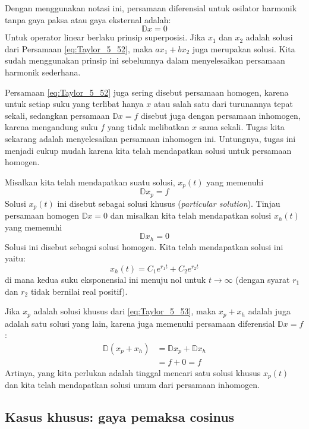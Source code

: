 Dengan menggunakan notasi ini, persamaan diferensial untuk osilator
harmonik tanpa gaya paksa atau gaya eksternal adalah:
\begin{equation}
\mathbb{D}x = 0
\label{eq:Taylor_5_52}
\end{equation}
Untuk operator linear berlaku prinsip superposisi. Jika $x_1$ dan $x_2$ adalah solusi
dari Persamaan \eqref{eq:Taylor_5_52}, maka $ax_1 + bx_2$ juga merupakan solusi. Kita
sudah menggunakan prinsip ini sebelumnya dalam menyelesaikan persamaan harmonik
sederhana.

Persamaan \eqref{eq:Taylor_5_52} juga sering disebut persamaan homogen, karena untuk
setiap suku yang terlibat hanya $x$ atau salah satu dari turunannya
tepat sekali, sedangkan persamaan $\mathbb{D}x = f$ disebut juga dengan
persamaan inhomogen, karena mengandung suku $f$ yang tidak melibatkan
$x$ sama sekali. Tugas kita sekarang adalah menyelesaikan persamaan inhomogen ini.
Untungnya, tugas ini menjadi cukup mudah karena kita telah mendapatkan
solusi untuk persamaan homogen.

Misalkan kita telah mendapatkan suatu solusi, $x_{p}(t)$ yang memenuhi
\begin{equation}
\mathbb{D}x_{p} = f
\label{eq:Taylor_5_53}
\end{equation}
Solusi $x_{p}(t)$ ini disebut sebagai solusi khusus (\textit{particular solution}).
Tinjau persamaan homogen $\mathbb{D}x=0$ dan misalkan kita telah
mendapatkan solusi $x_{h}(t)$ yang memenuhi
\begin{equation*}
\mathbb{D}x_{h}=0
\end{equation*}
Solusi ini disebut sebagai solusi homogen. Kita telah mendapatkan solusi ini
yaitu:
\[
x_{h}(t) = C_{1}e^{r_{1}t} + C_{2}e^{r_{2}t}
\]
di mana kedua suku eksponensial ini menuju nol untuk $t\rightarrow\infty$
(dengan syarat $r_{1}$ dan $r_{2}$ tidak bernilai real positif).

Jika $x_{p}$ adalah solusi khusus dari \ref{eq:Taylor_5_53}, maka
$x_{p}+x_{h}$ adalah juga adalah satu solusi yang lain, karena juga
memenuhi persamaan diferensial $\mathbb{D}x=f$:
\begin{align*}
\mathbb{D}(x_{p}+x_{h}) & =\mathbb{D}x_{p}+\mathbb{D}x_{h}\\
 & =f + 0 = f
\end{align*}
Artinya, yang kita perlukan adalah tinggal mencari satu solusi khusus $x_{p}(t)$
dan kita telah mendapatkan solusi umum dari persamaan inhomogen.

\subsection{Kasus khusus: gaya pemaksa cosinus}

